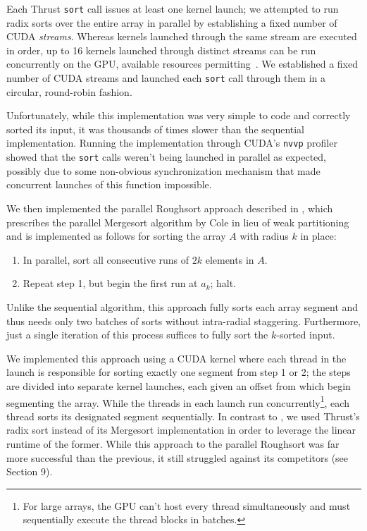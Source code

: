 \documentclass[letterpaper, 12pt]{article}
\let\supercite\cite
\renewcommand{\cite}[1]{\textnormal{~\supercite{#1}}}
\begin{document}
Each Thrust \texttt{sort} call issues at least one kernel launch; we attempted to run radix sorts over the entire array in
  parallel by establishing a fixed number of CUDA \textit{streams}.
Whereas kernels launched through the same stream are executed in order, up to 16 kernels launched through distinct streams can be
  run concurrently on the GPU, available resources permitting\cite{cuda}.
We established a fixed number of CUDA streams and launched each \texttt{sort} call through them in a circular, round-robin
  fashion.

Unfortunately, while this implementation was very simple to code and correctly sorted its input, it was thousands of times
  slower than the sequential implementation.
Running the implementation through CUDA's \texttt{nvvp} profiler showed that the \texttt{sort} calls weren't being launched in
  parallel as expected, possibly due to some non-obvious synchronization mechanism that made concurrent launches of this
  function impossible.

We then implemented the parallel Roughsort approach described in \supercite{altman90}, which prescribes the parallel Mergesort
  algorithm by Cole in lieu of weak partitioning and is implemented as follows for sorting the array $A$ with radius $k$ in
  place:
\begin{enumerate}\setlength{\itemsep}{0pt}\setlength{\parskip}{0pt}
\item In parallel, sort all consecutive runs of $2k$ elements in $A$.
\item Repeat step 1, but begin the first run at $a_k$; halt.
\end{enumerate}

Unlike the sequential algorithm, this approach fully sorts each array segment and thus needs only two batches of
  sorts without intra-radial staggering.
Furthermore, just a single iteration of this process suffices to fully sort the $k$-sorted input.

We implemented this approach using a CUDA kernel where each thread in the launch is responsible for sorting exactly one segment
  from step 1 or 2; the steps are divided into separate kernel launches, each given an offset from which begin segmenting the
  array.
While the threads in each launch run concurrently\footnote{For large arrays, the GPU can't host every thread simultaneously and
  must sequentially execute the thread blocks in batches.}, each thread sorts its designated segment sequentially.
In contrast to \supercite{altman90}, we used Thrust's radix sort instead of its Mergesort implementation in order to leverage
  the linear runtime of the former.
While this approach to the parallel Roughsort was far more successful than the previous, it still struggled against
  its competitors (see Section 9).
\end{document}
